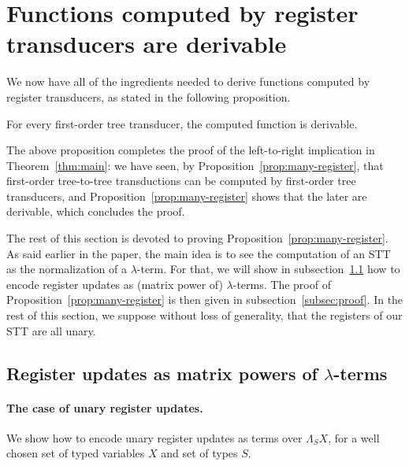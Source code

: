 
\section{Functions computed by register transducers are derivable}
\label{sec:stt-derivable}
We now  have all of the ingredients needed to derive functions computed by register transducers, as stated in the following proposition.
\begin{proposition}
    \label{prop:many-register} 
For every first-order  tree transducer, the computed function is derivable. 
\end{proposition}
The above proposition  completes the proof of the left-to-right implication in Theorem~\ref{thm:main}: we have seen, by Proposition~\ref{prop:many-register}, that first-order tree-to-tree transductions can be computed by first-order tree transducers, and Proposition~\ref{prop:many-register} shows that the later are derivable, which concludes the proof.

The rest of this section is devoted to proving Proposition~\ref{prop:many-register}. As said earlier in the paper, the main idea is to see the computation of an STT as the normalization of a $\lambda$-term. For that, we will show in subsection~\ref{subsec:ru-as-lambda} how to encode register updates as (matrix power of) $\lambda$-terms. The proof of Proposition~\ref{prop:many-register} is then given in subsection~\ref{subsec:proof}. In the rest of this section, we suppose without loss of generality, that the registers of our STT are all unary.

\subsection{Register updates as matrix powers of $\lambda$-terms}\label{subsec:ru-as-lambda}
\paragraph{The case of unary register updates.} We show how to encode unary register updates as terms over $\Lambda_S X$, for a well chosen set of typed variables $X$ and set of types $S$. 

